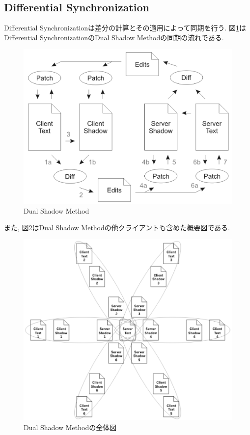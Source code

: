 \subsection{Differential Synchronization}
Differential Synchronizationは差分の計算とその適用によって同期を行う. 図\ref{DSfig}はDifferential SynchronizationのDual Shadow Methodの同期の流れである.
\begin{figure}[]
  \begin{center}
    \includegraphics[scale=0.5]{images/Dual_shadow}
    \caption{Dual Shadow Method\cite{DS}}
    \label{DSfig}
  \end{center}
\end{figure}
また, 図\ref{DSCT}はDual Shadow Methodの他クライアントも含めた概要図である.
\begin{figure}[]
  \begin{center}
    \includegraphics[scale=0.3]{images/DSCT}
    \caption{Dual Shadow Methodの全体図}
    \label{DSCT}
  \end{center}
\end{figure}
